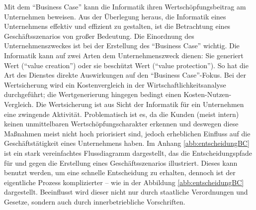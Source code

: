 Mit dem \enquote{Business Case} kann die Informatik ihren Wertschöpfungsbeitrag am Unternehmen beweisen. Aus der Überlegung heraus, die Informatik eines Unternehmens effektiv und effizient zu gestalten, ist die Betrachtung eines Geschäftsszenarios von großer Bedeutung. Die Einordnung des Unternehmenszweckes ist bei der Erstellung des \enquote{Business Case} wichtig. Die Informatik kann auf zwei Arten dem Unternehmenszweck dienen: Sie generiert Wert (\enquote{value creation}) oder sie beschützt Wert (\enquote{value protection}). So hat die Art des Dienstes direkte Auswirkungen auf den \enquote{Business Case}-Fokus. Bei der Wertsicherung wird ein Kostenvergleich in der Wirtschaftlichkeitsanalyse durchgeführt; die Wertgenerierung hingegen bedingt einen Kosten-Nutzen-Vergleich. Die Wertsicherung ist aus Sicht der Informatik für ein Unternehmen eine zwingende Aktivität. Problematisch ist es, da die Kunden (meist intern) keinen unmittelbaren Wertschöpfungscharakter erkennen und deswegen diese Maßnahmen meist nicht hoch priorisiert sind, jedoch erheblichen Einfluss auf die Geschäftstätigkeit eines Unternehmens haben.\autocite[vgl.][S.\,27]{brugger_it_2009} Im Anhang \vref{abb:entscheidungBC} ist ein stark vereinfachtes Flussdiagramm dargestellt, das die Entscheidungspfade für und gegen die Erstellung eines Geschäftsszenarios illustriert. Dieses kann benutzt werden, um eine schnelle Entscheidung zu erhalten, dennoch ist der eigentliche Prozess komplizierter -- wie in der Abbildung \vref{abb:entscheidungBC} dargestellt. Beeinflusst wird dieser nicht nur durch staatliche Verordnungen und Gesetze, sondern auch durch innerbetriebliche Vorschriften. 
\par
